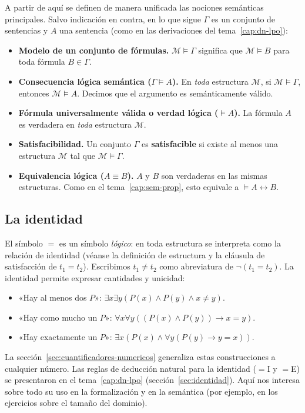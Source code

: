 \noindent A partir de aquí se definen de manera unificada las nociones semánticas principales. Salvo indicación en contra, en lo que sigue $\Gamma$ es un conjunto de sentencias y $A$ una sentencia (como en las derivaciones del tema~\ref{cap:dn-lpo}):
\begin{itemize}
    \item \textbf{Modelo de un conjunto de fórmulas.} $\mathcal{M} \models \Gamma$ significa que $\mathcal{M} \models B$ para toda fórmula $B \in \Gamma$.
    \item \textbf{Consecuencia lógica semántica ($\Gamma \models A$).} En \emph{toda} estructura $\mathcal{M}$, si $\mathcal{M} \models \Gamma$, entonces $\mathcal{M} \models A$. Decimos que el argumento es semánticamente válido.
    \item \textbf{Fórmula universalmente válida o verdad lógica ($\models A$).} La fórmula $A$ es verdadera en \emph{toda} estructura $\mathcal{M}$.
    \item \textbf{Satisfacibilidad.} Un conjunto $\Gamma$ es \textbf{satisfacible} si existe al menos una estructura $\mathcal{M}$ tal que $\mathcal{M} \models \Gamma$.
    \item \textbf{Equivalencia lógica ($A \equiv B$).} $A$ y $B$ son verdaderas en las mismas estructuras. Como en el tema~\ref{cap:sem-prop}, esto equivale a $\models A \leftrightarrow B$.
\end{itemize}


\subsection{La identidad}

El símbolo $=$ es un símbolo \emph{lógico}: en toda estructura se interpreta como la relación de identidad (véanse la definición de estructura y la cláusula de satisfacción de $t_1 = t_2$). Escribimos $t_1 \neq t_2$ como abreviatura de $\neg(t_1 = t_2)$. La identidad permite expresar cantidades y unicidad:
\begin{itemize}
    \item «Hay al menos dos $P$»: $\exists x \exists y (P(x) \land P(y) \land x \neq y)$.
    \item «Hay como mucho un $P$»: $\forall x \forall y ((P(x) \land P(y)) \to x = y)$.
    \item «Hay exactamente un $P$»: $\exists x (P(x) \land \forall y (P(y) \to y = x))$.
\end{itemize}
La sección~\ref{sec:cuantificadores-numericos} generaliza estas construcciones a cualquier número. Las reglas de deducción natural para la identidad ($=$I y $=$E) se presentaron en el tema~\ref{cap:dn-lpo} (sección~\ref{sec:identidad}). Aquí nos interesa sobre todo su uso en la formalización y en la semántica (por ejemplo, en los ejercicios sobre el tamaño del dominio).

